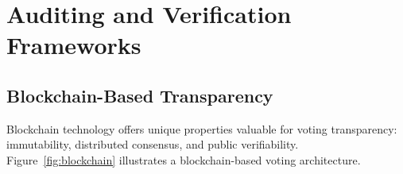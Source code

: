 \documentclass[sigconf,nonacm]{acmart}
\begin{document}
\section{Auditing and Verification Frameworks}

\subsection{Blockchain-Based Transparency}

Blockchain technology offers unique properties valuable for voting transparency:
immutability, distributed consensus, and public verifiability.
Figure~\ref{fig:blockchain} illustrates a blockchain-based voting architecture.
\end{document}
